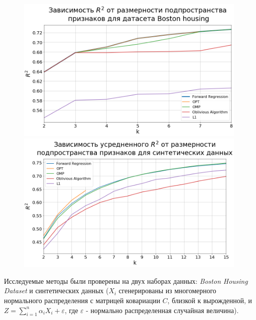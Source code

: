 \documentclass[preprint,12pt]{elsarticle}
\begin{document}
\begin{figure}[H]
    \begin{minipage}{.49\textwidth}
        \centering
        \includegraphics[width=1.1\linewidth]{img/boston_housing.png}
    \end{minipage}
    \begin{minipage}{.49\textwidth}
        \centering
        \includegraphics[width=1.1\linewidth]{img/sythetic_data.png}
    \end{minipage}
\end{figure}

Исследуемые методы были проверены на двух наборах данных: \textit{Boston Housing Dataset} и синтетических данных ($X_i$ сгенерированы из многомерного нормального распределения с матрицей ковариации $C$, близкой к вырожденной, и $Z = \sum\limits_{i = 1}^n \alpha_i X_i + \varepsilon$, где $\varepsilon$ - нормально распределенная случайная величина). \\
\end{document}
